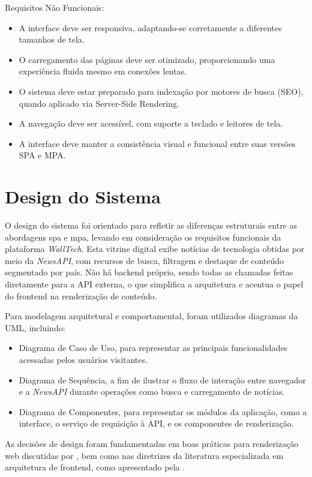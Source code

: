 Requisitos Não Funcionais:
\begin{itemize}
  \item A interface deve ser responsiva, adaptando-se corretamente a diferentes tamanhos de tela.
  \item O carregamento das páginas deve ser otimizado, proporcionando uma experiência fluida mesmo em conexões lentas.
  \item O sistema deve estar preparado para indexação por motores de busca (SEO), quando aplicado via Server-Side Rendering.
  \item A navegação deve ser acessível, com suporte a teclado e leitores de tela.
  \item A interface deve manter a consistência visual e funcional entre suas versões SPA e MPA.
\end{itemize}




\section{Design do Sistema}
\label{cap:design}

O design do sistema foi orientado para refletir as diferenças estruturais entre as abordagens \acrshort{spa} e \acrshort{mpa}, levando em consideração os requisitos funcionais da plataforma \textit{WallTech}. Esta vitrine digital exibe notícias de tecnologia obtidas por meio da \textit{NewsAPI}, com recursos de busca, filtragem e destaque de conteúdo segmentado por país. Não há backend próprio, sendo todas as chamadas feitas diretamente para a API externa, o que simplifica a arquitetura e acentua o papel do frontend na renderização de conteúdo.

Para modelagem arquitetural e comportamental, foram utilizados diagramas da UML, incluindo:
\begin{itemize}
  \item Diagrama de Caso de Uso, para representar as principais funcionalidades acessadas pelos usuários visitantes.
  \item Diagrama de Sequência, a fim de ilustrar o fluxo de interação entre navegador e a \textit{NewsAPI} durante operações como busca e carregamento de notícias.
  \item Diagrama de Componentes, para representar os módulos da aplicação, como a interface, o serviço de requisição à API, e os componentes de renderização.
\end{itemize}

As decisões de design foram fundamentadas em boas práticas para renderização web discutidas por \cite{osmani2025}, bem como nas diretrizes da literatura especializada em arquitetura de frontend, como apresentado pela \cite{atori2024}.

